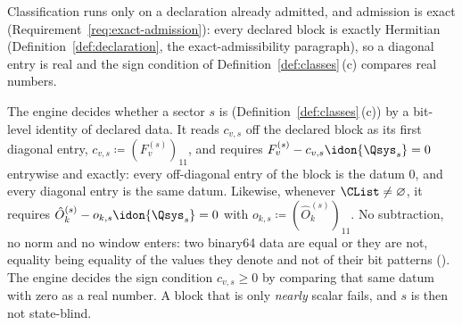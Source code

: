 
Classification runs only on a declaration already admitted, and admission
is exact (Requirement~\ref{req:exact-admission}): every declared block is
exactly Hermitian (Definition~\ref{def:declaration}, the
exact-admissibility paragraph), so a diagonal entry is real and the sign
condition of Definition~\ref{def:classes}\,(c) compares real numbers.

\begin{requirement}\label{req:state-blind-test}
The engine decides whether a sector $s$ is 
(Definition~\ref{def:classes}\,(c)) by a bit-level identity of declared
data. It reads $c_{v,s}$ off the declared block as its first diagonal
entry, $c_{v,s}\coloneqq(F^{(s)}_v)_{11}$, and requires
$F^{(s)}_v-c_{v,s}\idon{\Qsys_s}=0$ entrywise and exactly: every
off-diagonal entry of the block is the datum $0$, and every diagonal entry
is the same datum. Likewise, whenever $\CList\neq\varnothing$, it requires
$\hat O^{(s)}_k-o_{k,s}\idon{\Qsys_s}=0$ with
$o_{k,s}\coloneqq(\hat O^{(s)}_k)_{11}$. No subtraction, no norm and no
window enters: two binary64 data are equal or they are not, equality being
equality of the values they denote and not of their bit patterns
(). The engine decides the sign condition
$c_{v,s}\ge0$ by comparing that same datum with zero as a real number. A
block that is only \emph{nearly} scalar fails, and $s$ is then not
state-blind.
\end{requirement}

